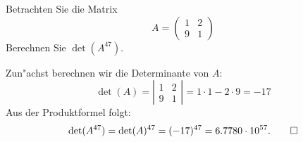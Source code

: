 Betrachten Sie die Matrix
\[
A=\begin{pmatrix}
1&2\\
9&1
\end{pmatrix}
\]
Berechnen Sie $\det(A^{47})$.

\begin{loesung}
Zun"achst berechnen wir die Determinante von $A$:
\[
\det(A)=
\left|
\begin{matrix}
1&2\\
9&1
\end{matrix}
\right|
=1\cdot 1 - 2 \cdot 9 = -17
\]
Aus der Produktformel folgt:
\[
\det(A^{47})
=
\det(A)^{47}
=
(-17)^{47}
=
6.7780\cdot 10^{57}.
\qedhere
\]
\end{loesung}




